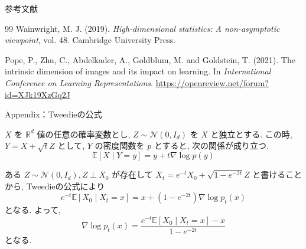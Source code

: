 \documentclass[11pt]{beamer}
\newcommand{\E}{\mathbb{E}}
\newcommand{\StdNormal}{\mathcal{N}(0,I_d)}
\begin{document}
\begin{frame}[allowframebreaks]{参考文献}
\begin{thebibliography}{99}
      Wainwright, M. J. (2019).
      \textit{High-dimensional statistics: A non-asymptotic viewpoint}, vol. 48.
      Cambridge University Press.

      Pope, P., Zhu, C., Abdelkader, A., Goldblum, M. and Goldstein, T. (2021).
      The intrinsic dimension of images and its impact on learning.
      In \textit{International Conference on Learning Representations}.
      \url{https://openreview.net/forum?id=XJk19XzGq2J}

  \end{thebibliography}
\end{frame}
\begin{frame}[t]{Appendix：Tweedieの公式}
  \begin{theorem}[Tweedieの公式]
    $X$ を $\mathbb{R}^d$ 値の任意の確率変数とし, $Z\sim \StdNormal$ を $X$ と独立とする. この時, $Y=X+\sqrt{t}Z$ として, $Y$ の密度関数を $p$ とすると, 次の関係が成り立つ.
    \begin{equation*}
      \E[X\mid Y=y]=y+t\nabla\log p(y)
    \end{equation*}
  \end{theorem}
  ある $Z\sim \StdNormal, Z\perp X_0$ が存在して $X_t=e^{-t}X_0+\sqrt{1-e^{-2t}}Z$ と書けることから,
  Tweedieの公式により
  \begin{equation*}
    e^{-t}\E[X_0\mid X_t=x]
    =x+(1-e^{-2t})\nabla\log{p_t(x)}
  \end{equation*}
  となる. よって,
  \begin{equation*}
    \nabla\log{p_t(x)}
    =\frac{e^{-t}\E[X_0\mid X_t=x]-x}{1-e^{-2t}}
  \end{equation*}
  となる.

\end{frame}
\end{document}
